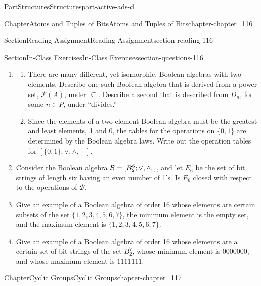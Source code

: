 \documentclass[oneside,10pt,]{book}
\numberwithin{equation}{section}
\begin{document}
\begin{partptx}{Part}{Structures}{}{Structures}{}{}{part-active-ads-d}
\begin{chapterptx}{Chapter}{Atoms and Tuples of Bits}{}{Atoms and Tuples of Bits}{}{}{chapter-chapter_116}
\begin{sectionptx}{Section}{Reading Assignment}{}{Reading Assignment}{}{}{section-reading-116}
\begin{itemize}[label=\textbullet]
\end{itemize}
%
\end{sectionptx}
%
%
\typeout{************************************************}
\typeout{************************************************}
%
\begin{sectionptx}{Section}{In-Class Exercises}{}{In-Class Exercises}{}{}{section-questions-116}
%
\begin{enumerate}[label=\arabic*.]
\item{}%
\begin{enumerate}[label=(\alph*)]
\item{}There are many different, yet isomorphic, Boolean algebras with two elements. Describe one such Boolean algebra that is derived from a power set, \(\mathcal{P}(A)\), under \(\subseteq\). Describe a second that is described from \(D_n\), for some \(n \in  P\), under ``divides.''%
\item{}Since the elements of a two-element Boolean algebra must be the greatest and least elements, 1 and 0, the tables for the operations on \(\{0, 1\}\) are determined by the Boolean algebra laws. Write out the operation tables for \([\{0, 1\}; \lor , \land, -]\).%
\end{enumerate}
%
\item{}Consider the Boolean algebra \(\mathcal{B} = [B_2^6 ; \lor, \land, \- ]\), and let \(E_6\) be the set of bit strings of length six having an even number of 1's.  Is \(E_6\) closed with respect to the operations of \(\mathcal{B}\).%
\item{}Give an example of a Boolean algebra of order 16 whose elements are certain subsets of the set \(\{1, 2, 3, 4, 5, 6, 7\}\), the minimum element is the empty set, and the maximum element is \(\{1, 2, 3, 4, 5, 6, 7\}\).%
\item{}Give an example of a Boolean algebra of order 16 whose elements are a certain set of bit strings of the set \(B_2^7\), whose minimum element is \(0000000\), and whose maximum element is \(1111111\).%
\end{enumerate}
%
\end{sectionptx}
\end{chapterptx}
%
\typeout{************************************************}
\typeout{************************************************}
%
\begin{chapterptx}{Chapter}{Cyclic Groups}{}{Cyclic Groups}{}{}{chapter-chapter_117}
\renewcommand*{\chaptername}{Chapter}
\index{}%

\end{chapterptx}
\end{partptx}
\end{document}
